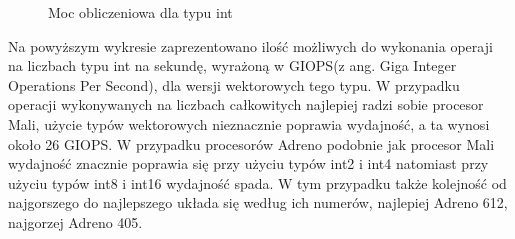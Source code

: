\begin{figure}[H]
\caption{Moc obliczeniowa dla typu int}
\end{figure}
Na powyższym wykresie zaprezentowano ilość możliwych do wykonania operaji na liczbach typu int na sekundę, wyrażoną w GIOPS(z ang. Giga Integer Operations Per Second), dla wersji wektorowych tego typu. W przypadku operacji wykonywanych na liczbach całkowitych najlepiej radzi sobie procesor Mali, użycie typów wektorowych nieznacznie poprawia wydajność, a ta wynosi około 26 GIOPS. W przypadku procesorów Adreno podobnie jak procesor Mali wydajność znacznie poprawia się przy użyciu typów int2 i int4 natomiast przy użyciu typów int8 i int16 wydajność spada. W tym przypadku także kolejność od najgorszego do najlepszego układa się według ich numerów, najlepiej Adreno 612, najgorzej Adreno 405.


